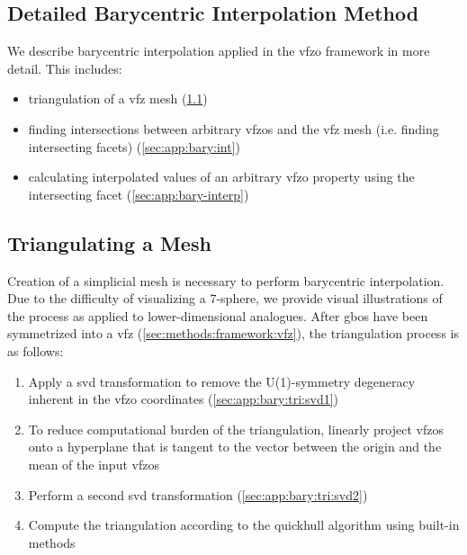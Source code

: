 \documentclass[final,twocolumn,12pt]{elsarticle}
\newcommand{\inpt}{input}
\begin{document}
\begin{appendices}


\section{Detailed Barycentric Interpolation Method}
\label{sec:app}
\renewcommand\thefigure{\thesection.\arabic{figure}} 
\setcounter{figure}{0}

We describe barycentric interpolation applied in the \gls{vfzo} framework in more detail. This includes:
\begin{itemize}
    \item[1] triangulation of a \gls{vfz} mesh (\cref{sec:app:bary:tri})
    \item[2] finding intersections between arbitrary \glspl{vfzo} and the \gls{vfz} mesh (i.e. finding intersecting facets) (\cref{sec:app:bary:int})
    \item[3] calculating interpolated values of an arbitrary \gls{vfzo} property using the intersecting facet (\cref{sec:app:bary-interp})
\end{itemize}

\subsection{Triangulating a  Mesh}
\label{sec:app:bary:tri}

Creation of a simplicial mesh is necessary to perform barycentric interpolation. Due to the difficulty of visualizing a 7-sphere, we provide visual illustrations of the process as applied to lower-dimensional analogues. After \glspl{gbo} have been symmetrized into a \gls{vfz} (\cref{sec:methods:framework:vfz}), the triangulation process is as follows:
\begin{enumerate}
    \item[1.1] Apply a \gls{svd} transformation to remove the U(1)-symmetry degeneracy inherent in the \gls{vfzo} coordinates (\cref{sec:app:bary:tri:svd1})
    \item[1.2] To reduce computational burden of the triangulation, linearly project \glspl{vfzo} onto a hyperplane that is tangent to the vector between the origin and the mean of the \inpt{} \glspl{vfzo}
    \item[1.3] Perform a second \gls{svd} transformation (\cref{sec:app:bary:tri:svd2})
    \item[1.4] Compute the triangulation according to the quickhull algorithm \cite{barberQuickhullAlgorithmConvex1996} using built-in methods
\end{enumerate}


\end{appendices}
\end{document}
